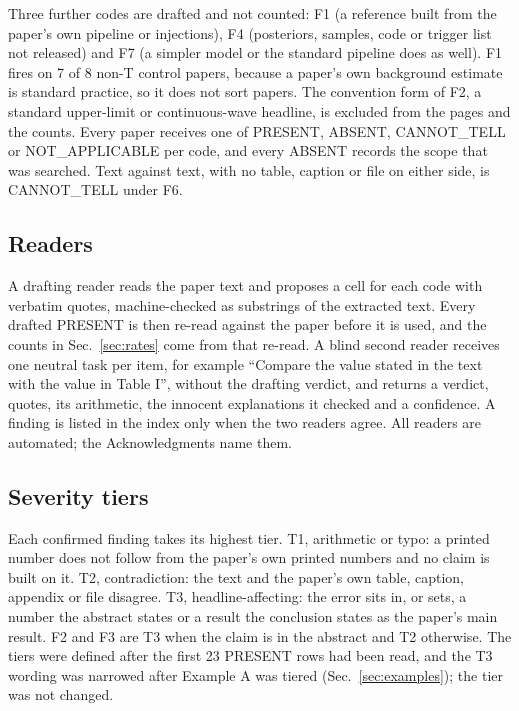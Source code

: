 \documentclass[reprint,amsmath,amssymb,aps,superscriptaddress,nofootinbib]{revtex4-2}
\begin{document}
Three further codes are drafted and not counted: F1 (a reference built from the paper's own pipeline or injections), F4 (posteriors, samples, code or trigger list not released) and F7 (a simpler model or the standard pipeline does as well). F1 fires on 7 of 8 non-T control papers, because a paper's own background estimate is standard practice, so it does not sort papers. The convention form of F2, a standard upper-limit or continuous-wave headline, is excluded from the pages and the counts. Every paper receives one of PRESENT, ABSENT, CANNOT\_TELL or NOT\_APPLICABLE per code, and every ABSENT records the scope that was searched. Text against text, with no table, caption or file on either side, is CANNOT\_TELL under F6.

\subsection{Readers}

A drafting reader reads the paper text and proposes a cell for each code with verbatim quotes, machine-checked as substrings of the extracted text. Every drafted PRESENT is then re-read against the paper before it is used, and the counts in Sec.~\ref{sec:rates} come from that re-read. A blind second reader receives one neutral task per item, for example ``Compare the value stated in the text with the value in Table I'', without the drafting verdict, and returns a verdict, quotes, its arithmetic, the innocent explanations it checked and a confidence. A finding is listed in the index only when the two readers agree. All readers are automated; the Acknowledgments name them.

\subsection{Severity tiers}

Each confirmed finding takes its highest tier. T1, arithmetic or typo: a printed number does not follow from the paper's own printed numbers and no claim is built on it. T2, contradiction: the text and the paper's own table, caption, appendix or file disagree. T3, headline-affecting: the error sits in, or sets, a number the abstract states or a result the conclusion states as the paper's main result. F2 and F3 are T3 when the claim is in the abstract and T2 otherwise. The tiers were defined after the first 23 PRESENT rows had been read, and the T3 wording was narrowed after Example A was tiered (Sec.~\ref{sec:examples}); the tier was not changed.
\end{document}
